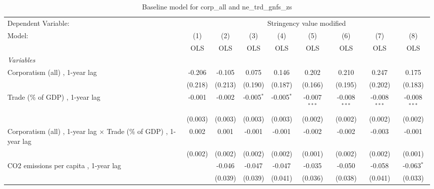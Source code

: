
\begin{table}[htbp]
   \caption{Baseline model for corp\_all and ne\_trd\_gnfs\_zs}
   \centering
   \begin{tabular}{lcccccccc}
      \toprule
      Dependent Variable: & \multicolumn{8}{c}{Stringency value modified}\\
      Model:                                                                   & (1)     & (2)     & (3)           & (4)           & (5)            & (6)            & (7)            & (8)\\  
                                                                               &  OLS    & OLS     & OLS           & OLS           & OLS            & OLS            & OLS            & OLS\\  
      \midrule
      \emph{Variables}\\
      Corporatism (all) , 1-year lag                                           & -0.206  & -0.105  & 0.075         & 0.146         & 0.202          & 0.210          & 0.247          & 0.175\\   
                                                                               & (0.218) & (0.213) & (0.190)       & (0.187)       & (0.166)        & (0.195)        & (0.202)        & (0.183)\\   
      Trade (\% of GDP) , 1-year lag                                           & -0.001  & -0.002  & -0.005$^{*}$  & -0.005$^{*}$  & -0.007$^{***}$ & -0.008$^{***}$ & -0.008$^{***}$ & -0.008$^{***}$\\   
                                                                               & (0.003) & (0.003) & (0.003)       & (0.003)       & (0.002)        & (0.002)        & (0.002)        & (0.002)\\   
      Corporatism (all) , 1-year lag $\times$ Trade (\% of GDP) , 1-year lag   & 0.002   & 0.001   & -0.001        & -0.001        & -0.002         & -0.002         & -0.003         & -0.001\\   
                                                                               & (0.002) & (0.002) & (0.002)       & (0.002)       & (0.001)        & (0.002)        & (0.002)        & (0.001)\\   
      CO2 emissions per capita , 1-year lag                                    &         & -0.046  & -0.047        & -0.047        & -0.035         & -0.050         & -0.058         & -0.063$^{*}$\\   
                                                                               &         & (0.039) & (0.039)       & (0.041)       & (0.036)        & (0.038)        & (0.041)        & (0.033)\\   

\end{tabular}
\end{table}
